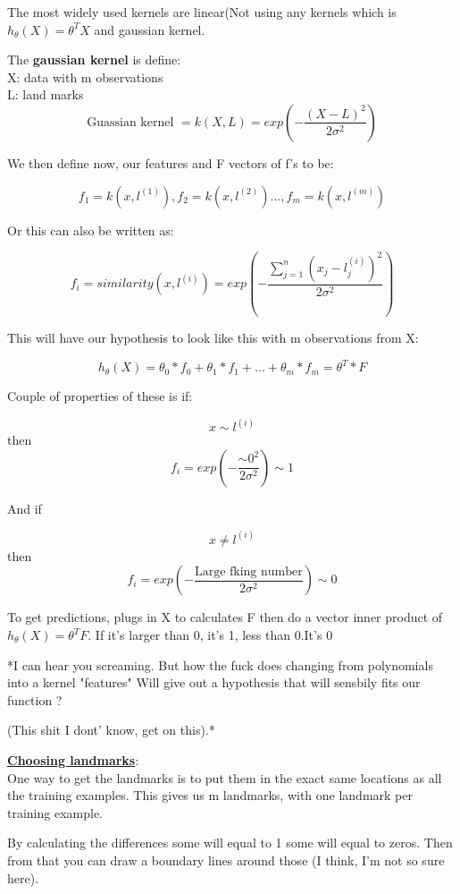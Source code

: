 \documentclass[30pt]{article}
\begin{document}
{The most widely used kernels are linear(Not using any kernels which is
$h_{\theta}(X)=\theta^TX$ and gaussian kernel.

The \textbf{gaussian kernel} is define:\\
X: data with m observations\\
L: land marks\\

\begin{equation}
	\text{Guassian kernel } = k(X,L) = exp(-\frac{(X - L)^2}{2\sigma^2})
\end{equation}

We then define now, our features and F vectors of f's to be:

$$f_1 = k(x,l^{(1)}), f_2 = k(x,l^{(2)}) ..., f_m = k(x,l^{(m)})$$

Or this can also be written as:

$$f_i = similarity(x,l^{(i)}) = exp(-\frac{\sum_{j=1}^{n} (x_j - l_{j}^{(i)})^2}{2\sigma^2})$$

This will have our hypothesis to look like this with m observations from X:

$$h_{\theta}(X) = \theta_0*f_0 + \theta_1*f_1 + ... + \theta_m*f_m = \theta^T*F$$

Couple of properties of these is if:

$$x \sim l^{(i)}$$ then $$f_i = exp(-\frac{\sim 0^2}{2\sigma^2}) \sim 1$$

And if 

$$x \neq l^{(i)}$$ then $$f_i = exp(-\frac{\text{Large fking number}}{2\sigma^2}) \sim 0
$$

To get predictions, plugs in X to calculates F then do a vector
inner product of $h_{\theta}(X) = \theta^TF$. If it's larger than 0, it's 1, less than 0.It's 0

*I can hear you screaming. But how the fuck does changing from polynomials into a kernel
"features" Will give out a hypothesis that will sensbily fits our function ? 

(This shit I dont' know, get on this).*

\underline{\textbf{Choosing landmarks}}:\\
One way to get the landmarks is to put them in the exact same locations as all
the training examples. This gives us m landmarks, with one landmark per
training example.

By calculating the differences some will equal to 1 some will equal to zeros. Then
from that you can draw a boundary lines around those (I think, I'm not so sure here).

}
\end{document}
